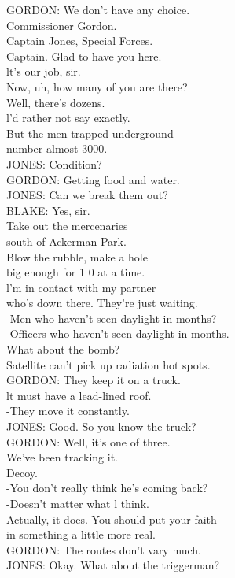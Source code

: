 \documentclass{article}
\begin{document}
\begin{multicols}{3}
GORDON: We don't have any choice.\\
Commissioner Gordon.\\
Captain Jones, Special Forces.\\
Captain. Glad to have you here.\\
lt's our job, sir.\\
Now, uh, how many of you are there?\\
Well, there's dozens.\\
l'd rather not say exactly.\\
But the men trapped underground\\
number almost 3000.\\
JONES: Condition?\\
GORDON: Getting food and water.\\
JONES: Can we break them out?\\
BLAKE: Yes, sir.\\
Take out the mercenaries\\
south of Ackerman Park.\\
Blow the rubble, make a hole\\
big enough for 1 0 at a time.\\
l'm in contact with my partner\\
who's down there. They're just waiting.\\
-Men who haven't seen daylight in months?\\
-Officers who haven't seen daylight in months.\\
What about the bomb?\\
Satellite can't pick up radiation hot spots.\\
GORDON: They keep it on a truck.\\
lt must have a lead-lined roof.\\
-They move it constantly.\\
JONES: Good. So you know the truck?\\
GORDON: Well, it's one of three.\\
We've been tracking it.\\
Decoy.\\
-You don't really think he's coming back?\\
-Doesn't matter what l think.\\
Actually, it does. You should put your faith\\
in something a little more real.\\
GORDON: The routes don't vary much.\\
JONES: Okay. What about the triggerman?\\

\end{multicols}
\end{document}
